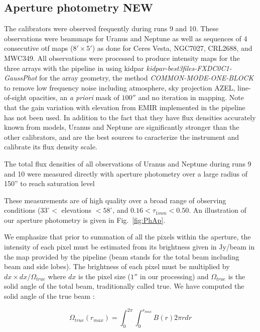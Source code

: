 

\subsection{Aperture photometry NEW}

The calibrators were observed frequently during runs 9 and 10. These observations were beammaps for Uranus and Neptune
as well as  sequences of 4 consecutive
otf maps ($8' \times 5'$) as done for Ceres Vesta, NGC7027, CRL2688, and MWC349. All observations were processed 
to produce intensity maps for the three arrays with the pipeline  in
using kidpar
{\it kidpar-best3files-FXDC0C1-GaussPhot} for the array geometry,
the method {\it COMMON-MODE-ONE-BLOCK}  to remove
 low frequency noise including atmosphere,
sky projection AZEL, line-of-sight opacities, an {\it a priori} mask of $100''$ and no iteration in mapping.
Note that the gain variation with elevation from EMIR implemented in the pipeline has not been used. 
In addition to the fact that they  have flux densities accurately known from models,
Uranus and Neptune are significantly stronger than the other calibrators, and  are the best sources to caracterize the
instrument and calibrate its flux density  scale.

The total flux densities of all observations of Uranus and Neptune during runs 9 and 10 were
measured directly with aperture photometry over a large radius of 150'' to reach saturation level

These measurements are of high quality over a broad range of observing conditions
($33^{\circ}<$ elevations $<58^{\circ}$, and   $0.16 < \tau_{1mm} < 0.50$.
An illustration of our aperture photometry is given in Fig.~\ref{fig:PhAp}.

We emphasize that prior to summation of all the pixels within the aperture, the intensity of each pixel must be estimated
from its brightness  given in Jy/beam in the map provided by the
pipeline (beam stands  for the total beam including beam and side lobes).
The brightness of each pixel must be multiplied by
$dx \times dx / \Omega_{true}$ where  $dx$ is the pixel size ($1''$ in our processing)
and $\Omega_{true}$  is the solid angle of the total beam, traditionally called true.
We have computed the solid angle of the true beam :

$$ \Omega_{true} (r_{max}) = \int_0^{2\pi} \int_0^{r_{max}} B(r) 2 \pi r dr$$

